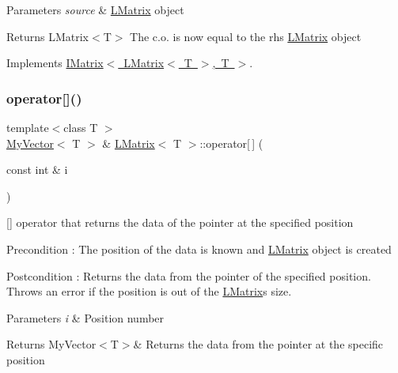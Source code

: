 \begin{DoxyParams}{Parameters}
{\em source} & \mbox{\hyperlink{class_l_matrix}{L\+Matrix}} object \\
\hline
\end{DoxyParams}
\begin{DoxyReturn}{Returns}
L\+Matrix$<$\+T$>$ The c.\+o. is now equal to the rhs \mbox{\hyperlink{class_l_matrix}{L\+Matrix}} object 
\end{DoxyReturn}


Implements \mbox{\hyperlink{class_i_matrix}{I\+Matrix$<$ L\+Matrix$<$ T $>$, T $>$}}.

\mbox{\label{class_l_matrix_a7eab2a6c57437448d21a04484844e359}} 
\subsubsection{\texorpdfstring{operator[]()}{operator[]()}\hspace{0.1cm}{\footnotesize\ttfamily [1/2]}}
{\footnotesize\ttfamily template$<$class T $>$ \\
\mbox{\hyperlink{class_my_vector}{My\+Vector}}$<$ T $>$ \& \mbox{\hyperlink{class_l_matrix}{L\+Matrix}}$<$ T $>$\+::operator\mbox{[}$\,$\mbox{]} (\begin{DoxyParamCaption}\item[{const int \&}]{i }\end{DoxyParamCaption})\hspace{0.3cm}{\ttfamily [virtual]}}



\mbox{[}\mbox{]} operator that returns the data of the pointer at the specified position 

\begin{DoxyPrecond}{Precondition}
\+: The position of the data is known and \mbox{\hyperlink{class_l_matrix}{L\+Matrix}} object is created 
\end{DoxyPrecond}
\begin{DoxyPostcond}{Postcondition}
\+: Returns the data from the pointer of the specified position. Throws an error if the position is out of the \mbox{\hyperlink{class_l_matrix}{L\+Matrix}}\textquotesingle{}s size. 
\end{DoxyPostcond}

\begin{DoxyParams}{Parameters}
{\em i} & Position number \\
\hline
\end{DoxyParams}
\begin{DoxyReturn}{Returns}
My\+Vector$<$\+T$>$\& Returns the data from the pointer at the specific position 
\end{DoxyReturn}


